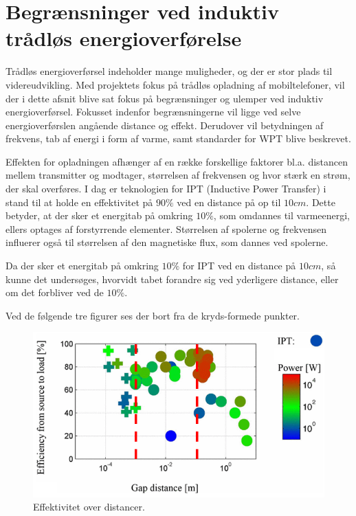 \section{Begrænsninger ved induktiv trådløs energioverførelse}

Trådløs energioverførsel indeholder mange muligheder, og der er stor plads til videreudvikling. Med projektets fokus på trådløs opladning af mobiltelefoner, vil der i dette afsnit blive sat fokus på begrænsninger og ulemper ved induktiv energioverførsel. Fokusset indenfor begrænsningerne vil ligge ved selve energioverførslen angående distance og effekt. Derudover vil betydningen af frekvens, tab af energi i form af varme, samt standarder for WPT blive beskrevet.

Effekten for opladningen afhænger af en række forskellige faktorer bl.a. distancen mellem transmitter og modtager, størrelsen af frekvensen og hvor stærk en strøm, der skal overføres. I dag er teknologien for IPT (Inductive Power Transfer) i stand til at holde en effektivitet på $90\%$ ved en distance på op til $10cm$. Dette betyder, at der sker et energitab på omkring $10\%$, som omdannes til varmeenergi, ellers optages af forstyrrende elementer. Størrelsen af spolerne og frekvensen influerer også til størrelsen af den magnetiske flux, som dannes ved spolerne.

Da der sker et energitab på omkring $10\%$ for IPT ved en distance på $10cm$, så kunne det undersøges, hvorvidt tabet forandre sig ved yderligere distance, eller om det forbliver ved de $10\%$. \cite{limit}

Ved de følgende tre figurer ses der bort fra de kryds-formede punkter.

\begin{figure}[H]
\centering
\includegraphics[scale=0.5]{Vildledning/Schematics/Effektivitet_vs_gap.png}
\caption{Effektivitet over distancer. \cite{limit}}
\label{effektivitet}
\end{figure}

